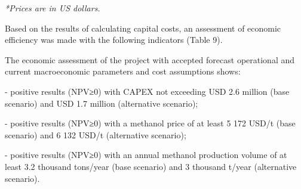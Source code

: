 
\emph{*Prices are in US dollars.}

Based on the results of calculating capital costs, an assessment of
economic efficiency was made with the following indicators (Table 9).

The economic assessment of the project with accepted forecast
operational and current macroeconomic parameters and cost assumptions
shows:

- positive results (NPV≥0) with CAPEX not exceeding USD 2.6 million
(base scenario) and USD 1.7 million (alternative scenario);

- positive results (NPV≥0) with a methanol price of at least 5 172 USD/t
(base scenario) and 6 132 USD/t (alternative scenario);

- positive results (NPV≥0) with an annual methanol production volume of
at least 3.2 thousand tons/year (base scenario) and 3 thousand t/year
(alternative scenario).

